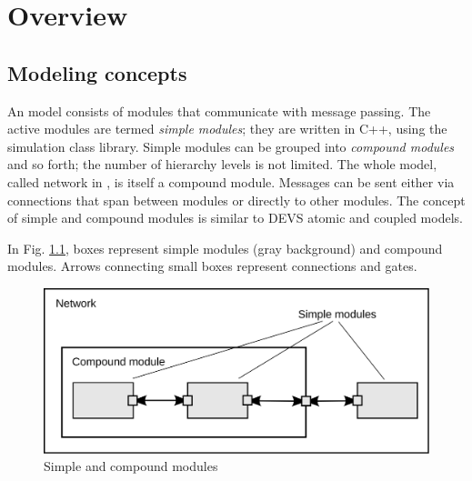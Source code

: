 \chapter{Overview}
\label{cha:overview}


\section{Modeling concepts}

An {\opp} model consists of modules that communicate with message passing.
The active modules are termed \textit{simple modules}; they are written in C++,
using the simulation class library. Simple modules can be grouped into
\textit{compound modules} and so forth; the number of hierarchy levels is not
limited. The whole model, called network in {\opp}, is itself a compound module.
Messages can be sent either via connections that span between
modules or directly to other modules. The concept of simple and
compound modules is similar to DEVS atomic and coupled models.

In Fig. \ref{fig:ch-overview:modules}, boxes represent simple modules
(gray background) and compound modules.
Arrows connecting small boxes represent connections and gates.

\begin{figure}[htbp]
\centering
\includegraphics[scale=0.6]{figures/over-modules}
\caption{Simple and compound modules}
\label{fig:ch-overview:modules}
\end{figure}



